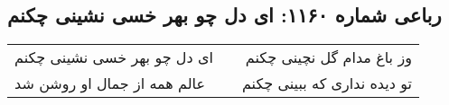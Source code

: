 \begin{center}
\section*{رباعی شماره ۱۱۶۰: ای دل چو بهر خسی نشینی چکنم}
\label{sec:1160}
\begin{longtable}{l p{0.5cm} r}
ای دل چو بهر خسی نشینی چکنم
&&
وز باغ مدام گل نچینی چکنم
\\
عالم همه از جمال او روشن شد
&&
تو دیده نداری که ببینی چکنم
\\
\end{longtable}
\end{center}
